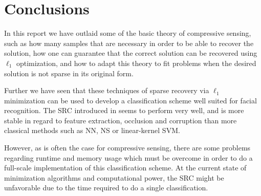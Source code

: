 \vspace{-6pt}\chapter{Conclusions}
In this report we have outlaid some of the basic theory of compressive sensing, such as how many samples that are necessary in order to be able to recover the solution, how one can guarantee that the correct solution can be recovered using $ \ell_{1} $ optimization, and how to adapt this theory to fit problems when the desired solution is not sparse in its original form. 

Further we have seen that these techniques of sparse recovery via $ \ell_{1} $ minimization can be used to develop a classification scheme well suited for facial recognition. The SRC introduced in \cite{wright09facerecog} seems to perform very well, and is more stable in regard to feature extraction, occlusion and corruption than more classical methods such as NN, NS or linear-kernel SVM. 

However, as is often the case for compressive sensing, there are some problems regarding runtime and memory usage which must be overcome in order to do a full-scale implementation of this classification scheme. At the current state of minimization algorithms and computational power, the SRC might be unfavorable due to the time required to do a single classification. 


